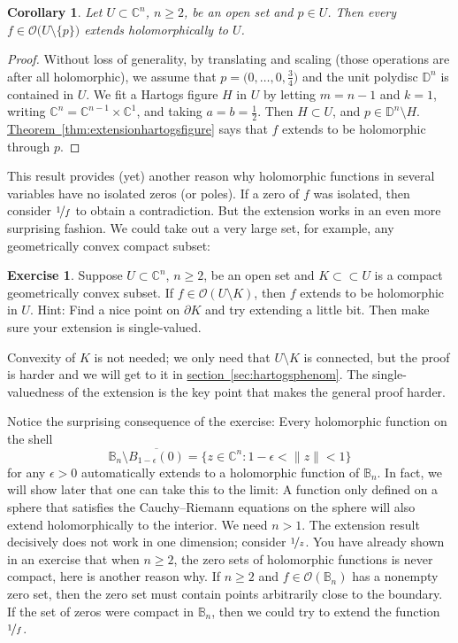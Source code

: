 \documentclass[12pt,openany]{book}
\newcommand{\snorm}[1]{\lVert {#1} \rVert}
\newcommand{\C}{{\mathbb{C}}}
\newcommand{\D}{{\mathbb{D}}}
\newcommand{\bB}{{\mathbb{B}}}
\newcommand{\sO}{{\mathscr{O}}}
\theoremstyle{plain}
\newtheorem{cor}[thm]{Corollary}
\theoremstyle{remark}
\theoremstyle{definition}
\newenvironment{exbox}{%
    \def\FrameCommand{\vrule width 1pt \relax\hspace{10pt}}%
    \MakeFramed{\advance\hsize-\width\FrameRestore}%
}{%
    \endMakeFramed
}
\theoremstyle{exercise}
\newtheorem{exercise}{Exercise}[section]
\theoremstyle{example}
\newcommand{\sectionref}[1]{\hyperref[#1]{section~\ref*{#1}}}
\newcommand{\thmref}[1]{\hyperref[#1]{Theorem~\ref*{#1}}}
\begin{document}
\begin{cor}
Let $U \subset \C^n$, $n \geq 2$, be an open set and $p \in U$.
Then every $f \in \sO\bigl(U \setminus \{ p \} \bigr)$
extends holomorphically to $U$.
\end{cor}

\begin{proof}
Without loss of generality,
by translating and scaling (those operations are after all holomorphic),
we assume that $p = \bigl(0,\ldots,0,\frac{3}{4}\bigr)$
and the unit polydisc $\D^n$ is contained in $U$.  We fit a Hartogs figure $H$
in $U$
by letting $m=n-1$ and $k=1$, writing $\C^n = \C^{n-1} \times \C^{1}$,
and taking $a = b = \frac{1}{2}$.
Then $H \subset U$, and $p \in \D^n \setminus H$.
\thmref{thm:extensionhartogsfigure} says that
$f$ extends to be holomorphic through $p$.
\end{proof}

This result provides (yet) another reason why holomorphic functions in several
variables have no isolated zeros (or poles).  If a zero of $f$ was isolated, then
consider $\nicefrac{1}{f}$ to obtain a contradiction.
But the extension works in an even more surprising fashion.  We could
take out a very large set, for example, any geometrically
convex compact subset:

\begin{exbox}
\begin{exercise} \label{exercise:convexhartogs}
Suppose $U \subset \C^n$, $n \geq 2$, be an open set and $K \subset \subset U$
is a compact geometrically
convex subset.
If $f \in \sO(U \setminus K)$,
then $f$ extends to be holomorphic in $U$.
Hint: Find a nice point on $\partial K$ and try extending a little bit.
Then make sure your extension is single-valued.
\end{exercise}
\end{exbox}

Convexity of $K$ is not needed; we only need that $U\setminus K$
is connected, but the proof is harder and we will get to it in
\sectionref{sec:hartogsphenom}.
The single-valuedness of the extension is the key point that makes the
general proof harder.

Notice the surprising consequence of the exercise:
Every holomorphic function on the shell
\begin{equation*}
\bB_n \setminus \overline{B_{1-\epsilon}(0)} =
\bigl\{ z \in \C^n : 1-\epsilon < \snorm{z} < 1 \bigr\}
\end{equation*}
for any $\epsilon > 0$ automatically
extends to a holomorphic function of $\bB_n$.
In fact, we will show later that one can take this to the limit:
A function only defined on a sphere that satisfies the Cauchy--Riemann
equations on the sphere will also extend holomorphically to the interior.
We need $n > 1$.
The extension result decisively does not work in one dimension; consider $\nicefrac{1}{z}$.
You have already shown in an exercise that when $n \geq 2$, the zero
sets of holomorphic functions is never compact, here is another reason why.
If $n \geq 2$ and $f \in \sO(\bB_n)$ has a nonempty zero set,
then the zero set must contain points arbitrarily close to the boundary.
If the set of zeros were compact in $\bB_n$, then we could try to
extend the function $\nicefrac{1}{f}$.
\end{document}
